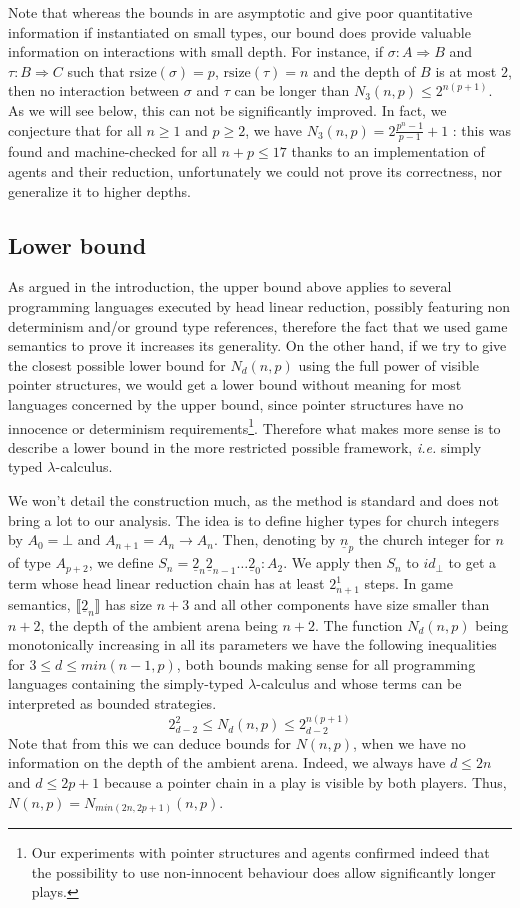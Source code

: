 \documentclass{article}
\newcommand{\tto}{\Rightarrow}
\newcommand{\intr}[1]{\llbracket #1 \rrbracket}
\newcommand{\church}[1]{\underline{#1}}
\newcommand{\size}{\mathrm{rsize}}
\begin{document}
Note that whereas the bounds in \cite{beckmann2001exact} are asymptotic and give poor quantitative information if instantiated on small types, our bound does provide valuable information on interactions with
small depth. For instance, if $\sigma : A\tto B$ and $\tau: B \tto C$ such that $\size(\sigma) = p$,
$\size(\tau) = n$ and the depth of $B$ is at most $2$, then no interaction between $\sigma$ and $\tau$ can be longer than $N_3(n, p) \leq 2^{n(p+1)}$. As we will see below, this can not be significantly improved.
In fact, we conjecture that for all $n\geq 1$ and $p\geq 2$, we have $N_3(n,p) = 2\frac{p^n-1}{p- 1}+1$ : this was found and machine-checked for all $n+p \leq 17$ thanks to an implementation of agents and their
reduction, unfortunately we could not prove its correctness, nor generalize it to higher depths.


\subsection{Lower bound}

As argued in the introduction, the upper bound above applies to several programming languages executed by head linear reduction, possibly featuring non determinism and/or ground type references, therefore the fact that
we used game semantics to prove it increases its generality. On the other hand, if we try to give the closest possible lower bound for $N_d(n,p)$ using the full power of visible pointer structures, we would get a lower
bound without meaning for most languages concerned by the upper bound, since pointer structures have no innocence or determinism requirements\footnote{Our experiments with pointer structures and agents confirmed indeed that the
possibility to use non-innocent behaviour does allow significantly longer plays.}. Therefore what makes more sense is to describe a lower bound in the more restricted possible framework, \emph{i.e.}
simply typed $\lambda$-calculus.


We won't detail the construction much, as the method is standard and does not bring a lot to our analysis. The idea is to define higher types for church integers by $A_0 = \bot$ and $A_{n+1} = A_n \to A_n$. Then, 
denoting by $\church{n}_p$ the church integer for $n$ of type $A_{p+2}$, we define $S_n = \church{2}_n \church{2}_{n-1} \dots \church{2}_0 : A_2$. We apply then $S_n$ to $id_\bot$ to get a term whose head linear
reduction chain has at least $2_{n+1}^1$ steps. In game semantics, $\intr{\church{2}_n}$ has size $n+3$ and all other components have size smaller than $n+2$, the depth of the ambient arena being $n+2$. The function $N_d(n,p)$ being
monotonically increasing in all its parameters we have the following inequalities for $3 \leq d \leq min(n-1, p)$, both bounds making sense for all programming languages containing the simply-typed $\lambda$-calculus and whose 
terms can be interpreted as bounded strategies.
\[
2_{d-2}^2 \leq N_d(n,p) \leq 2_{d-2}^{n(p+1)}
\]
Note that from this we can deduce bounds for $N(n,p)$, when we have no information on the depth of the ambient arena. Indeed, we always have $d\leq 2n$ and $d\leq 2p+1$ because a pointer chain in a play
is visible by both players. Thus, $N(n,p) = N_{min(2n, 2p+1)}(n,p)$.
\end{document}
